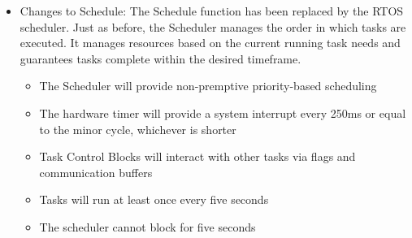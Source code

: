 \documentclass[12pt]{article} %
\begin{document}
\begin{itemize}
  \item Changes to Schedule:
		The Schedule function has been replaced by the RTOS scheduler. Just as
		before, the Scheduler manages the order in which tasks are executed. It
		manages resources based on the current running task needs and guarantees
		tasks complete within the desired timeframe.
    \begin{itemize}
			\item The Scheduler will provide non-premptive priority-based scheduling
      \item The hardware timer will provide a system interrupt every 250ms or
	equal to the minor cycle, whichever is shorter
      \item Task Control Blocks will interact with other tasks via flags and communication buffers
			\item Tasks will run at least once every five seconds
      \item The scheduler cannot block for five seconds
    \end{itemize}


\end{itemize}
\end{document}
